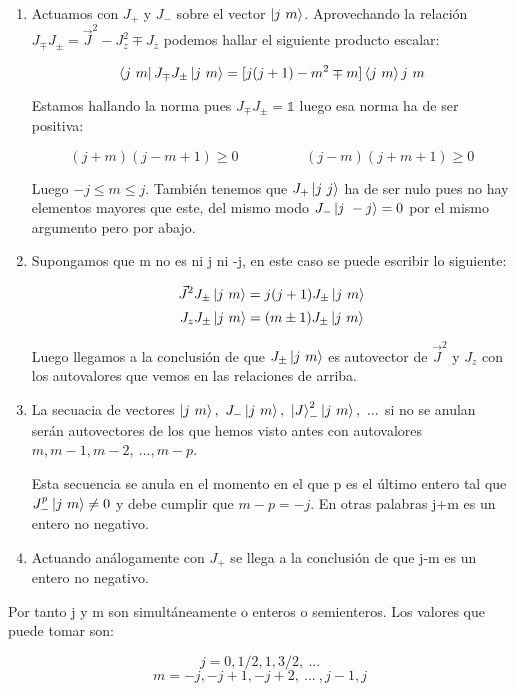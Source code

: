 \documentclass{article}
\begin{document}
        \begin{enumerate}
            \item Actuamos con $J_+$ y $J_-$ sobre el vector $\ket{j \ m}$. Aprovechando la relación $J_\mp J_\pm =\Vec{J}^2- J_z^2 \mp J_z$ podemos hallar el siguiente producto escalar:

            $$\bra{ j \ m} J_\mp J_\pm  \ket{j \ m}= [j(j+1) - m^2 \mp m]\braket{j \ m}{j \ m}$$

            Estamos hallando la norma pues $J_\mp J_\pm =\mathds{1}$ luego esa norma ha de ser positiva:

            $$(j+m)(j-m+1) \geq 0 \hspace{2cm} (j-m)(j+m +1) \geq 0$$

            Luego $-j \leq m \leq j$. También tenemos que $J_+ \ket{j \ j}$ ha de ser nulo pues no hay elementos mayores que este, del mismo modo $J_- \ket{j \ -j}=0$ por el mismo argumento pero por abajo.

            \item Supongamos que m no es ni j ni -j, en este caso se puede escribir lo siguiente:

            $$\Vec{J}^2J_\pm \ket{j \ m} =j(j+1) J_\pm \ket{j \ m}$$
            $$J_z J_\pm \ket{ j \ m}= (m\pm 1)J_\pm \ket{j \ m}$$

            Luego llegamos a la conclusión de que $J_\pm \ket{j \ m}$ es autovector de $\Vec{J}^2$ y $J_z$ con los autovalores que vemos en las relaciones de arriba.

            \item La secuacia de vectores $\ket{j \ m}, \ J_- \ket{j \ m}, \ \ket{J}_-^2 \ket{j \ m}, \ ...$ si no se anulan serán autovectores de los que hemos visto antes con autovalores $m, m-1, m-2, \ ..., m-p$.

            Esta secuencia se anula en el momento en el que p es el último entero tal que $J_-^p \ket{ j \ m} \neq 0$ y debe cumplir que $m-p=-j$. En otras palabras j+m es un entero no negativo.

            \item Actuando análogamente con $J_+$ se llega a la conclusión de que j-m es un entero no negativo.
        \end{enumerate}

        Por tanto j y m son simultáneamente o enteros o semienteros. Los valores que puede tomar son:

        $$j=0,1/2,1,3/2, \ ...$$
        $$m=-j,-j+1,-j+2, \ ... \ , j-1, j$$
\end{document}
